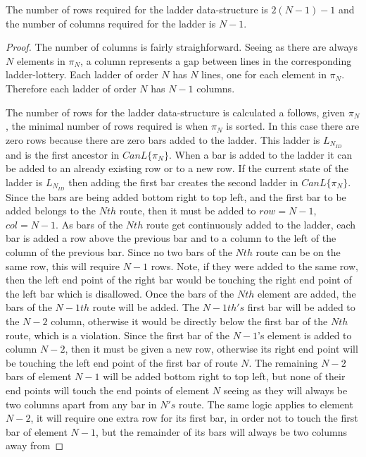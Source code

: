 \begin{theorem}
  The number of rows required for the ladder data-structure is $2(N-1) - 1$ and the number of columns required for 
  the ladder is $N-1$.
\end{theorem}
\begin{proof}
  The number of columns is fairly straighforward. Seeing as there are always $N$ elements in $\pi_{N}$, 
  a column represents a gap between lines in the corresponding ladder-lottery. Each ladder of order $N$ has $N$ lines, 
  one for each element in $\pi_{N}$. Therefore each ladder of order $N$ has $N-1$ columns.\par 
  The number of rows for the ladder data-structure is calculated a follows, given $\pi_{N}$, the minimal 
  number of rows required is when $\pi_{N}$ is sorted. In this case there are zero rows because there are 
  zero bars added to the ladder. This ladder is $L_{N_{ID}}$ and is 
  the first ancestor in $CanL\{\pi_{N}\}$. When a bar is added to the ladder it can be added to an already existing row 
  or to a new row. If the current state of the ladder is $L_{N_{ID}}$ then adding the first bar creates the second ladder in
  $CanL\{\pi_{N}\}$. Since the bars are being added bottom right to top left, and the first bar to be added belongs 
  to the $Nth$ route, then it must be added to $row=N-1$, $col=N-1$. As bars of the $Nth$ route get 
  continuously added to the ladder, each bar is added a row above the previous bar and to a column 
  to the left of the column of the previous bar.
  Since no two bars of the $Nth$ route can be on the same row, this will require $N-1$ rows. Note, if they were added to the same 
  row, then the left end point of the right bar would be touching the right end point of the left bar which is disallowed. Once the 
  bars of the $Nth$ element are added, the bars of the $N-1th$ route will be added. The $N-1th's$ first bar 
  will be added to the $N-2$ column, otherwise it would be directly below the first bar of the $Nth$ route, which is a violation. 
  Since the first bar of the $N-1$'s element is added to column $N-2$, then it must be given a new row, otherwise its right end point 
  will be touching  the left end point of the first bar of route $N$. The remaining $N-2$ bars of element $N-1$
  will be added bottom right to top left, but none of their end points will touch the end points of element $N$ seeing as they will 
  always be two columns apart from any bar in $N's$ route. The same logic applies to element $N-2$, it will require one extra row for its 
  first bar, in order not to touch the first bar of element $N-1$, but the remainder of its bars will always be two columns away from 

\end{proof}
